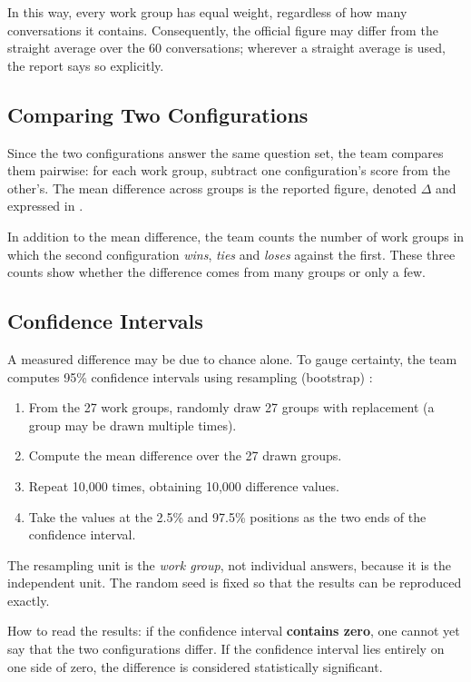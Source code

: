 In this way, every work group has equal weight, regardless of how many conversations it contains. Consequently, the official figure may differ from the straight average over the 60 conversations; wherever a straight average is used, the report says so explicitly.

\subsection{Comparing Two Configurations}

Since the two configurations answer the same question set, the team compares them pairwise: for each work group, subtract one configuration's score from the other's. The mean difference across groups is the reported figure, denoted $\Delta$ and expressed in \pp.

In addition to the mean difference, the team counts the number of work groups in which the second configuration \emph{wins}, \emph{ties} and \emph{loses} against the first. These three counts show whether the difference comes from many groups or only a few.

\subsection{Confidence Intervals}

A measured difference may be due to chance alone. To gauge certainty, the team computes 95\% confidence intervals using resampling (bootstrap) :

\begin{enumerate}
    \item From the 27 work groups, randomly draw 27 groups with replacement (a group may be drawn multiple times).
    \item Compute the mean difference over the 27 drawn groups.
    \item Repeat 10,000 times, obtaining 10,000 difference values.
    \item Take the values at the 2.5\% and 97.5\% positions as the two ends of the confidence interval.
\end{enumerate}

The resampling unit is the \emph{work group}, not individual answers, because it is the independent unit. The random seed is fixed so that the results can be reproduced exactly.

How to read the results: if the confidence interval \textbf{contains zero}, one cannot yet say that the two configurations differ. If the confidence interval lies entirely on one side of zero, the difference is considered statistically significant.

